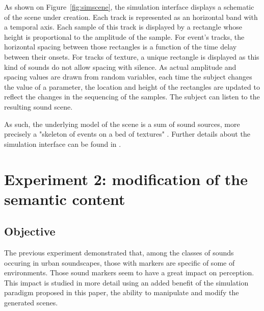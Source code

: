 \documentclass[twoside,twocolumn]{article}
\begin{document}
As shown on Figure~\ref{fig:simscene}, the simulation interface displays a schematic of the scene under creation. Each track is represented as an horizontal band with a temporal axis. Each sample of this track is displayed by a rectangle whose height is proportional to the amplitude of the sample. For event's tracks, the horizontal spacing between those rectangles is a function of the time delay between their onsets. For tracks of texture, a unique rectangle is displayed as this kind of sounds do not allow spacing with silence. As actual amplitude and spacing values are drawn from random variables, each time the subject changes the value of a parameter, the location and height of the rectangles are updated to reflect the changes in the sequencing of the samples. The subject can listen to the resulting sound scene.


As such, the underlying model of the scene is a sum of sound sources, more precisely a "skeleton of events on a bed of textures" \cite{nelken2013ear}. Further details about the simulation interface can be found in \cite{rossignol2015simscene}.

\section{Experiment 2: modification of the semantic content}
\label{sec:xp3}

\subsection{Objective}


The previous experiment demonstrated that, among the classes of sounds occuring in urban soundscapes, those with markers are specific of some of environments. Those sound markers seem to have a great impact on perception. This impact is studied in more detail using an added benefit of the simulation paradigm proposed in this paper, the ability to manipulate and modify the generated scenes.
\end{document}
